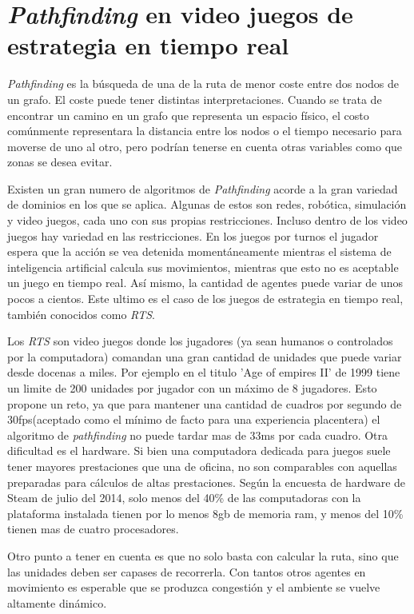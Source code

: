 
\section{\emph{Pathfinding} en video juegos de estrategia en tiempo real}

\emph{Pathfinding} es la búsqueda de una de la ruta de menor coste entre dos
nodos de un grafo. El coste puede tener distintas interpretaciones. Cuando se
trata de encontrar un camino en un grafo que representa un espacio físico, el
costo comúnmente representara la distancia entre los nodos o el tiempo necesario
para moverse de uno al otro, pero podrían tenerse en cuenta otras variables como
que zonas se desea evitar.

Existen un gran numero de algoritmos de \emph{Pathfinding} acorde a la gran
variedad de dominios en los que se aplica. Algunas de estos son redes,
robótica, simulación y video juegos, cada uno con sus propias restricciones.
Incluso dentro de los video juegos hay variedad en las restricciones. En los
juegos por turnos el jugador espera que la acción se vea detenida
momentáneamente mientras el sistema de inteligencia artificial calcula sus
movimientos, mientras que esto no es aceptable un juego en tiempo real. Así
mismo, la cantidad de agentes puede variar de unos pocos a cientos. Este ultimo
es el caso de los juegos de estrategia en tiempo real, también conocidos como
\emph{RTS}.

Los \emph{RTS} son video juegos donde los jugadores (ya sean humanos o
controlados por la computadora) comandan una gran cantidad de unidades que puede
variar desde docenas a miles. Por ejemplo en el titulo 'Age of empires II' de
1999 tiene un limite de 200 unidades por jugador con un máximo de 8 jugadores.
Esto propone un reto, ya que para mantener una cantidad de cuadros por segundo
de 30fps(aceptado como el mínimo de facto para una experiencia
placentera\cite{framerate06}) el algoritmo de \emph{pathfinding} no puede tardar
mas de 33ms por cada cuadro. Otra dificultad es el hardware. Si bien una
computadora dedicada para juegos suele tener mayores prestaciones que una de
oficina, no son comparables con aquellas preparadas para cálculos de altas
prestaciones. Según la encuesta de hardware de Steam\cite{steamSurvey} de julio
del 2014, solo menos del 40\% de las computadoras con la plataforma instalada
tienen por lo menos 8gb de memoria ram, y menos del 10\% tienen mas de cuatro
procesadores. 

Otro punto a tener en cuenta es que no solo basta con calcular la ruta, sino que
las unidades deben ser capases de recorrerla. Con tantos otros agentes en
movimiento es esperable que se produzca congestión y el ambiente se vuelve
altamente dinámico.

